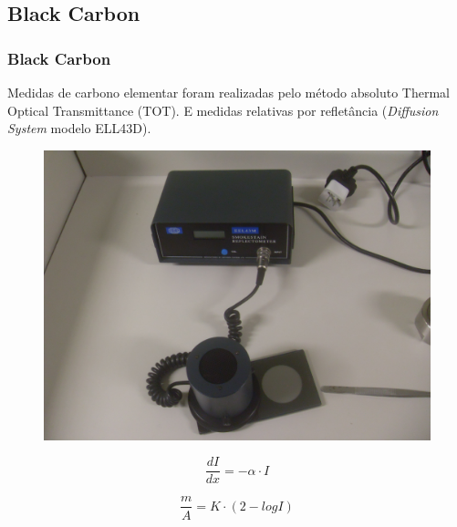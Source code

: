 \subsection{Black Carbon}
\begin{frame}
  \frametitle{Black Carbon}
 
Medidas de carbono elementar foram realizadas pelo método absoluto Thermal
Optical Transmittance (TOT). E medidas relativas por refletância 
(\textit{Diffusion System} modelo ELL43D).

  \begin{figure}[H]
  	\centering
  	\includegraphics[width=0.38\linewidth]{../../inputs/images/refletometro.jpg}
  \end{figure}

  \begin{equation*}
  \label{eq:dIdx}
  \frac{dI}{dx} = -\alpha \cdot I
  \end{equation*}
 
  \begin{equation*}
  \label{m/a_2}
  \frac{m}{A} = K \cdot (2-logI) 
  \end{equation*}
\end{frame}

